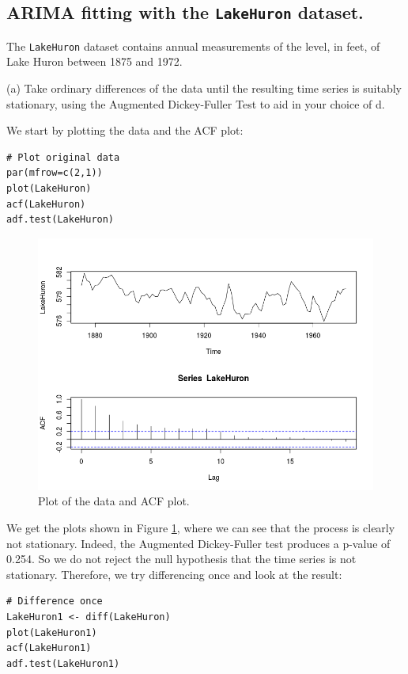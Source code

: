 \documentclass[]{article}
\begin{document}
\subsection{ARIMA fitting with the \texttt{LakeHuron} dataset.}
The \texttt{LakeHuron} dataset contains annual measurements of the level, in feet, of Lake Huron between 1875 and 1972.

(a) Take ordinary differences of the data until the resulting time series is suitably stationary, using the Augmented Dickey-Fuller Test to aid in your choice of d.

\color{blue}
We start by plotting the data and the ACF plot:

\begin{Verbatim}[frame=single]
# Plot original data
par(mfrow=c(2,1))
plot(LakeHuron)
acf(LakeHuron)
adf.test(LakeHuron)
\end{Verbatim}

\begin{figure}[!ht]
\centering
\includegraphics[width=.8\textwidth]{huronplot.png}
\caption{Plot of the data and ACF plot.}
\label{huronplot}
\end{figure}


We get the plots shown in Figure \ref{huronplot}, where we can see that the process is clearly not stationary. Indeed, the Augmented Dickey-Fuller test produces a p-value of 0.254. So we do not reject the null hypothesis that the time series is not stationary. Therefore, we try differencing once and look at the result:

\begin{Verbatim}[frame=single]
# Difference once
LakeHuron1 <- diff(LakeHuron)
plot(LakeHuron1)
acf(LakeHuron1)
adf.test(LakeHuron1)
\end{Verbatim}
\end{document}
